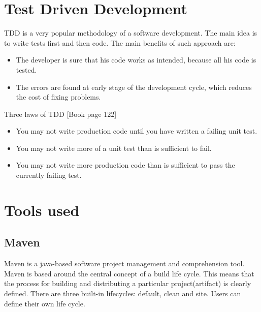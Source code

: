   \section{Test Driven Development}
  TDD is a very popular methodology of a software development. The main idea is
  to write tests first and then code. The main benefits of such approach are:
      \begin{itemize}
        \item The developer is sure that his code works as intended, because all
        his code is tested.
        \item The errors are found at early stage of the development cycle, which
        reduces the cost of fixing problems.
      \end{itemize}
      
      Three laws of TDD \cite[pp122]{Cleancode}[Book page 122]
        \begin{itemize}
          \item You may not write production code until you have written a failing unit test.
          \item You may not write more of a unit test than is sufficient to fail.
          \item You may not write more production code than is sufficient to pass the currently failing test.
        \end{itemize}
        
  \section {Tools used}
  \label{sec:toolsused}
  
  \subsection{Maven}
  Maven is a java-based software project management and comprehension tool.
  Maven is based around the central concept of a build life cycle. This means
  that the process for building and distributing a particular project(artifact) is clearly defined. There are three built-in lifecycles:
  default, clean and site. Users can define their own life cycle. 
  
